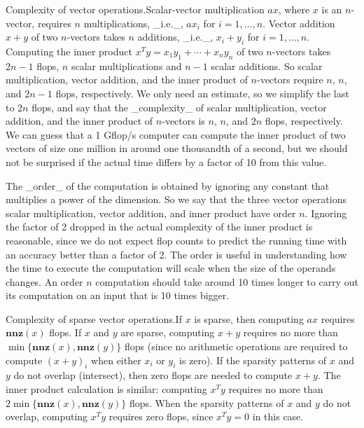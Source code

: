 
Complexity of vector operations.Scalar-vector multiplication \(ax\), where \(x\) is an \(n\)-vector, requires \(n\) multiplications, _i.e._, \(ax_{i}\) for \(i=1,\ldots,n\). Vector addition \(x+y\) of two \(n\)-vectors takes \(n\) additions, _i.e._, \(x_{i}+y_{i}\) for \(i=1,\ldots,n\). Computing the inner product \(x^{T}y=x_{1}y_{1}+\cdots+x_{n}y_{n}\) of two \(n\)-vectors takes \(2n-1\) flops, \(n\) scalar multiplications and \(n-1\) scalar additions. So scalar multiplication, vector addition, and the inner product of \(n\)-vectors require \(n\), \(n\), and \(2n-1\) flops, respectively. We only need an estimate, so we simplify the last to \(2n\) flops, and say that the _complexity_ of scalar multiplication, vector addition, and the inner product of \(n\)-vectors is \(n\), \(n\), and \(2n\) flops, respectively. We can guess that a 1 Gflop/s computer can compute the inner product of two vectors of size one million in around one thousandth of a second, but we should not be surprised if the actual time differs by a factor of 10 from this value.

The _order_ of the computation is obtained by ignoring any constant that multiplies a power of the dimension. So we say that the three vector operations scalar multiplication, vector addition, and inner product have order \(n\). Ignoring the factor of 2 dropped in the actual complexity of the inner product is reasonable, since we do not expect flop counts to predict the running time with an accuracy better than a factor of 2. The order is useful in understanding how the time to execute the computation will scale when the size of the operands changes. An order \(n\) computation should take around 10 times longer to carry out its computation on an input that is 10 times bigger.

Complexity of sparse vector operations.If \(x\) is sparse, then computing \(ax\) requires \(\mathbf{nnz}(x)\) flops. If \(x\) and \(y\) are sparse, computing \(x+y\) requires no more than \(\min\{\mathbf{nnz}(x),\mathbf{nnz}(y)\}\) flops (since no arithmetic operations are required to compute \((x+y)_{i}\) when either \(x_{i}\) or \(y_{i}\) is zero). If the sparsity patterns of \(x\) and \(y\) do not overlap (intersect), then zero flops are needed to compute \(x+y\). The inner product calculation is similar: computing \(x^{T}y\) requires no more than \(2\min\{\mathbf{nnz}(x),\mathbf{nnz}(y)\}\) flops. When the sparsity patterns of \(x\) and \(y\) do not overlap, computing \(x^{T}y\) requires zero flops, since \(x^{T}y=0\) in this case.

 